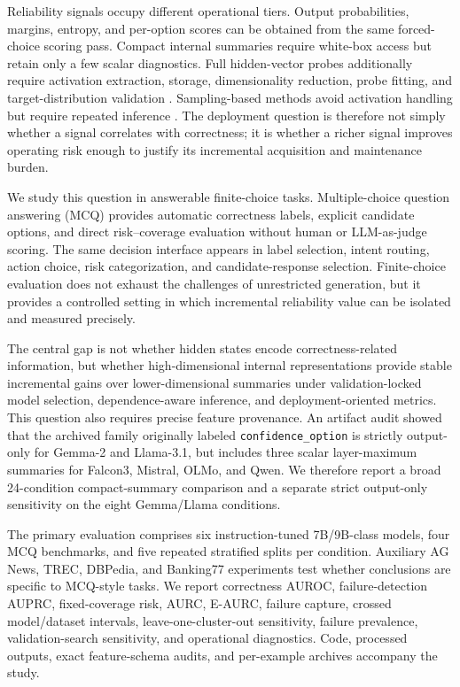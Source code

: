 \documentclass[preprint,12pt,authoryear]{elsarticle}
\begin{document}
Reliability signals occupy different operational tiers. Output probabilities, margins, entropy, and per-option scores can be obtained from the same forced-choice scoring pass. Compact internal summaries require white-box access but retain only a few scalar diagnostics. Full hidden-vector probes additionally require activation extraction, storage, dimensionality reduction, probe fitting, and target-distribution validation \citep{chen2024inside,ji2024internal,orgad2024llms}. Sampling-based methods avoid activation handling but require repeated inference \citep{manakul2023selfcheckgpt,farquhar2024semanticentropy}. The deployment question is therefore not simply whether a signal correlates with correctness; it is whether a richer signal improves operating risk enough to justify its incremental acquisition and maintenance burden.

We study this question in answerable finite-choice tasks. Multiple-choice question answering (MCQ) provides automatic correctness labels, explicit candidate options, and direct risk--coverage evaluation without human or LLM-as-judge scoring. The same decision interface appears in label selection, intent routing, action choice, risk categorization, and candidate-response selection. Finite-choice evaluation does not exhaust the challenges of unrestricted generation, but it provides a controlled setting in which incremental reliability value can be isolated and measured precisely.

The central gap is not whether hidden states encode correctness-related information, but whether high-dimensional internal representations provide stable incremental gains over lower-dimensional summaries under validation-locked model selection, dependence-aware inference, and deployment-oriented metrics. This question also requires precise feature provenance. An artifact audit showed that the archived family originally labeled \texttt{confidence\_option} is strictly output-only for Gemma-2 and Llama-3.1, but includes three scalar layer-maximum summaries for Falcon3, Mistral, OLMo, and Qwen. We therefore report a broad 24-condition compact-summary comparison and a separate strict output-only sensitivity on the eight Gemma/Llama conditions.

The primary evaluation comprises six instruction-tuned 7B/9B-class models, four MCQ benchmarks, and five repeated stratified splits per condition. Auxiliary AG News, TREC, DBPedia, and Banking77 experiments test whether conclusions are specific to MCQ-style tasks. We report correctness AUROC, failure-detection AUPRC, fixed-coverage risk, AURC, E-AURC, failure capture, crossed model/dataset intervals, leave-one-cluster-out sensitivity, failure prevalence, validation-search sensitivity, and operational diagnostics. Code, processed outputs, exact feature-schema audits, and per-example archives accompany the study.
\end{document}
